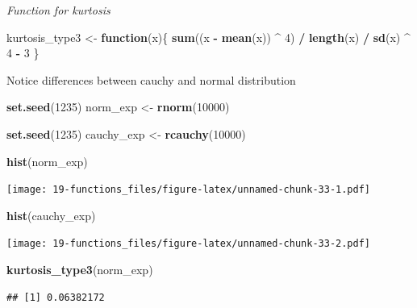 \documentclass[]{book}
\newenvironment{Shaded}{\begin{snugshade}}{\end{snugshade}}
\newcommand{\ControlFlowTok}[1]{\textcolor[rgb]{0.13,0.29,0.53}{\textbf{#1}}}
\newcommand{\DecValTok}[1]{\textcolor[rgb]{0.00,0.00,0.81}{#1}}
\newcommand{\KeywordTok}[1]{\textcolor[rgb]{0.13,0.29,0.53}{\textbf{#1}}}
\newcommand{\NormalTok}[1]{#1}
\newcommand{\OperatorTok}[1]{\textcolor[rgb]{0.81,0.36,0.00}{\textbf{#1}}}
\newcommand{\StringTok}[1]{\textcolor[rgb]{0.31,0.60,0.02}{#1}}
\theoremstyle{definition}
\theoremstyle{definition}
\theoremstyle{definition}
\theoremstyle{remark}
\begin{document}
\emph{Function for kurtosis}

\begin{Shaded}
\begin{Highlighting}[]
\NormalTok{kurtosis_type3 <-}\StringTok{ }\ControlFlowTok{function}\NormalTok{(x)\{}
  \KeywordTok{sum}\NormalTok{((x }\OperatorTok{-}\StringTok{ }\KeywordTok{mean}\NormalTok{(x)) }\OperatorTok{^}\StringTok{ }\DecValTok{4}\NormalTok{) }\OperatorTok{/}\StringTok{ }\KeywordTok{length}\NormalTok{(x) }\OperatorTok{/}\StringTok{ }\KeywordTok{sd}\NormalTok{(x) }\OperatorTok{^}\StringTok{ }\DecValTok{4} \OperatorTok{-}\StringTok{ }\DecValTok{3}
\NormalTok{\}}
\end{Highlighting}
\end{Shaded}

Notice differences between cauchy and normal distribution

\begin{Shaded}
\begin{Highlighting}[]
\KeywordTok{set.seed}\NormalTok{(}\DecValTok{1235}\NormalTok{)}
\NormalTok{norm_exp <-}\StringTok{ }\KeywordTok{rnorm}\NormalTok{(}\DecValTok{10000}\NormalTok{)}

\KeywordTok{set.seed}\NormalTok{(}\DecValTok{1235}\NormalTok{)}
\NormalTok{cauchy_exp <-}\StringTok{ }\KeywordTok{rcauchy}\NormalTok{(}\DecValTok{10000}\NormalTok{)}

\KeywordTok{hist}\NormalTok{(norm_exp)}
\end{Highlighting}
\end{Shaded}

\texttt{[image: 19-functions\_files/figure-latex/unnamed-chunk-33-1.pdf]}

\begin{Shaded}
\begin{Highlighting}[]
\KeywordTok{hist}\NormalTok{(cauchy_exp)}
\end{Highlighting}
\end{Shaded}

\texttt{[image: 19-functions\_files/figure-latex/unnamed-chunk-33-2.pdf]}

\begin{Shaded}
\begin{Highlighting}[]
\KeywordTok{kurtosis_type3}\NormalTok{(norm_exp)}
\end{Highlighting}
\end{Shaded}

\begin{verbatim}
## [1] 0.06382172
\end{verbatim}
\end{document}
